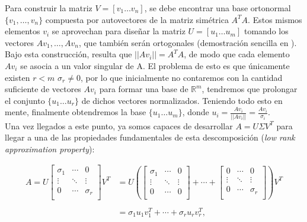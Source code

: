 \vspace{-0.2cm}
Para construir la matriz $V = [v_1 \dots v_n]$, se debe encontrar una base ortonormal $\{v_1, \dots, v_n\}$ compuesta por autovectores de la matriz simétrica $A^T A$. Estos mismos elementos $v_i$ se aprovechan para diseñar la matriz $U = [u_1 \dots u_m]$ tomando los vectores $Av_1, \dots, Av_n$, que también serán ortogonales (demostración sencilla en \cite{biblia}). \\

Bajo esta construcción, resulta que $||A v_i|| = A^T A$, de modo que cada elemento $A v_i$ se asocia a un valor singular de A. El problema de esto es que únicamente existen $r < m$ $\sigma_r \neq 0$, por lo que inicialmente no contaremos con la cantidad suficiente de vectores $A v_i$ para formar una base de $\mathds{R}^m$, tendremos que prolongar el conjunto $\{u_1 \dots u_r\}$ de dichos vectores normalizados. Teniendo todo esto en mente, finalmente obtendremos la base $\{u_1 \dots u_m\}$, donde $u_i = \frac{A v_i}{||A v_i||} = \frac{A v_i}{\sigma_i}$. \\

Una vez llegados a este punto, ya somos capaces de
desarrollar $A = U \Sigma V^T$ para llegar a una de las propiedades fundamentales de esta descomposición (\textit{low rank approximation property}): 

\begin{equation*}
    \begin{array}{ll}
        A = U 
        \begin{bmatrix}
        \sigma_1 & \cdots & 0        \\
        \vdots   & \ddots & \vdots   \\
        0        & \cdots & \sigma_r \\
        \end{bmatrix}
        V^T & = U
        \left(
        \begin{bmatrix}
        \sigma_1 & \cdots & 0        \\
        \vdots   & \ddots & \vdots   \\
        0        & \cdots & 0        \\
        \end{bmatrix} + \cdots +
        \begin{bmatrix}
        0        & \cdots & 0        \\
        \vdots   & \ddots & \vdots   \\
        0        & \cdots & \sigma_r \\
        \end{bmatrix}
        \right) V^T\\
        \\
         & = \sigma_1 u_1 v_1^T + \cdots + \sigma_r u_r  v_r^T,
    \end{array}
\end{equation*}

